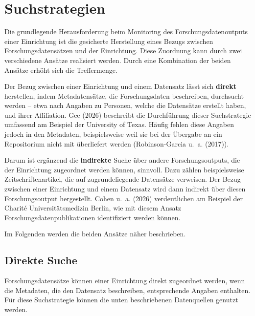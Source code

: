 \documentclass[
  ngerman,
  letterpaper,
  DIV=11]{scrreprt}
\begin{document}
\section{Suchstrategien}\label{suchstrategien}

Die grundlegende Herausforderung beim Monitoring des
Forschungsdatenoutputs einer Einrichtung ist die gesicherte Herstellung
eines Bezugs zwischen Forschungsdatensätzen und der Einrichtung. Diese
Zuordnung kann durch zwei verschiedene Ansätze realisiert werden. Durch
eine Kombination der beiden Ansätze erhöht sich die Treffermenge.

Der Bezug zwischen einer Einrichtung und einem Datensatz lässt sich
\textbf{direkt} herstellen, indem Metadatensätze, die Forschungsdaten
beschreiben, durchsucht werden -- etwa nach Angaben zu Personen, welche
die Datensätze erstellt haben, und ihrer Affiliation. Gee (2026)
beschreibt die Durchführung dieser Suchstrategie umfassend am Beispiel
der University of Texas. Häufig fehlen diese Angaben jedoch in den
Metadaten, beispielsweise weil sie bei der Übergabe an ein Repositorium
nicht mit überliefert werden (Robinson-Garcia u.~a. (2017)).

Darum ist ergänzend die \textbf{indirekte} Suche über andere
Forschungsoutputs, die der Einrichtung zugeordnet werden können,
sinnvoll. Dazu zählen beispielsweise Zeitschriftenartikel, die auf
zugrundeliegende Datensätze verweisen. Der Bezug zwischen einer
Einrichtung und einem Datensatz wird dann indirekt über diesen
Forschungsoutput hergestellt. Cohen u.~a. (2026) verdeutlichen am
Beispiel der Charité Universitätsmedizin Berlin, wie mit diesem Ansatz
Forschungsdatenpublikationen identifiziert werden können.

Im Folgenden werden die beiden Ansätze näher beschrieben.

\subsection{Direkte Suche}\label{direkte-suche}

Forschungsdatensätze können einer Einrichtung direkt zugeordnet werden,
wenn die Metadaten, die den Datensatz beschreiben, entsprechende Angaben
enthalten. Für diese Suchstrategie können die unten beschriebenen
Datenquellen genutzt werden.
\end{document}
